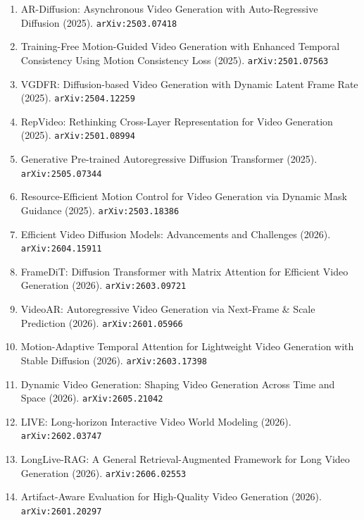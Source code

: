 \documentclass[11pt]{article}
\begin{document}
\begin{enumerate}
  \item AR-Diffusion: Asynchronous Video Generation with Auto-Regressive
  Diffusion (2025). \texttt{arXiv:2503.07418}
  \item Training-Free Motion-Guided Video Generation with Enhanced Temporal
  Consistency Using Motion Consistency Loss (2025). \texttt{arXiv:2501.07563}
  \item VGDFR: Diffusion-based Video Generation with Dynamic Latent Frame Rate (2025). \texttt{arXiv:2504.12259}
  \item RepVideo: Rethinking Cross-Layer Representation for Video Generation (2025). \texttt{arXiv:2501.08994}
  \item Generative Pre-trained Autoregressive Diffusion Transformer (2025). \texttt{arXiv:2505.07344}
  \item Resource-Efficient Motion Control for Video Generation via Dynamic Mask
  Guidance (2025). \texttt{arXiv:2503.18386}
  \item Efficient Video Diffusion Models: Advancements and Challenges (2026). \texttt{arXiv:2604.15911}
  \item FrameDiT: Diffusion Transformer with Matrix Attention for Efficient Video Generation (2026). \texttt{arXiv:2603.09721}
  \item VideoAR: Autoregressive Video Generation via Next-Frame \& Scale Prediction (2026). \texttt{arXiv:2601.05966}
  \item Motion-Adaptive Temporal Attention for Lightweight Video Generation with Stable Diffusion (2026). \texttt{arXiv:2603.17398}
  \item Dynamic Video Generation: Shaping Video Generation Across Time and Space (2026). \texttt{arXiv:2605.21042}
  \item LIVE: Long-horizon Interactive Video World Modeling (2026). \texttt{arXiv:2602.03747}
  \item LongLive-RAG: A General Retrieval-Augmented Framework for Long Video Generation (2026). \texttt{arXiv:2606.02553}
  \item Artifact-Aware Evaluation for High-Quality Video Generation (2026). \texttt{arXiv:2601.20297}
\end{enumerate}
\end{document}
